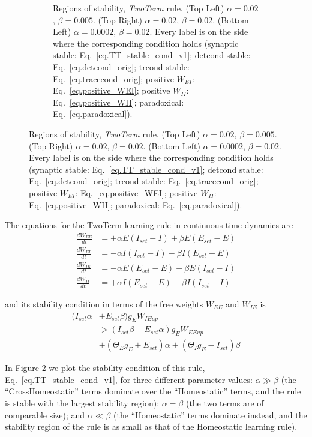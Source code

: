 \documentclass[twocolumn]{article}
\newcommand{\EE}{\mathit{EE}}
\newcommand{\EI}{\mathit{EI}}
\newcommand{\IE}{\mathit{IE}}
\newcommand{\II}{\mathit{II}}
\newcommand{\set}{\mathit{set}}
\newcommand{\up}{\mathit{up}}
\begin{document}
\begin{figure}[!ht]
{\begin{figure}[H]
\caption{Regions of stability, {\em TwoTerm} rule. (Top Left) $\alpha=0.02$, $\beta=0.005$. (Top Right) $\alpha=0.02$, $\beta=0.02$. (Bottom Left) $\alpha=0.0002$, $\beta=0.02$. Every label is on the side where the  corresponding  condition  holds (synaptic stable: Eq.\ \ref{eq.TT_stable_cond_v1}; detcond stable: Eq.\ \ref{eq.detcond_orig}; trcond stable: Eq.\ \ref{eq.tracecond_orig}; positive $W_{\EI}$: Eq.\ \ref{eq.positive_WEI}; positive $W_{\II}$: Eq.\ \ref{eq.positive_WII}; paradoxical: Eq.\ \ref{eq.paradoxical}).}
\label{fig.TT_stability}
\end{figure}}
\end{figure}



The equations for the TwoTerm learning rule in continuous-time dynamics are
\begin{equation}
\begin{aligned}
\frac{dW_{\EE}}{dt} & = +\alpha E (I_{\set} - I) + \beta E (E_{\set} - E) \\
\frac{dW_{\EI}}{dt} & = -\alpha I (I_{\set} - I) - \beta I (E_{\set} - E) \\
\frac{dW_{\IE}}{dt} & = -\alpha E (E_{\set} - E) + \beta E (I_{\set} - I) \\
\frac{dW_{\II}}{dt} & = +\alpha I (E_{\set} - E) - \beta I (I_{\set} - I)
\end{aligned}
\label{eq.TT_summary}
\end{equation}

\noindent and its stability condition in terms of the free weights $W_{\EE}$ and $W_{\IE}$ is
\begin{equation}
\begin{aligned}
(I_{\set} \alpha & + E_{\set} \beta) g_E W_{\IE\up} \\
& > (I_{\set} \beta - E_{\set} \alpha) g_E W_{\EE\up} \\
& + (\Theta_E g_E + E_{\set}) \alpha + (\Theta_I g_E - I_{\set}) \beta
\end{aligned}
\label{eq.TT_stable_cond_v1}
\end{equation}

In Figure \ref{fig.TT_stability} we plot the stability condition of this rule, Eq.\ \ref{eq.TT_stable_cond_v1}, for three different parameter values: $\alpha \gg \beta$ (the ``CrossHomeostatic'' terms dominate over the ``Homeostatic'' terms, and the rule is stable with the largest stability region); $\alpha = \beta$ (the two terms are of comparable size); and $\alpha \ll \beta$ (the ``Homeostatic'' terms dominate instead, and the stability region of the rule is as small as that of the Homeostatic learning rule).
\end{document}
